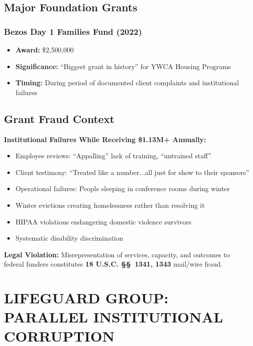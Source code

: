 \documentclass[11pt,letterpaper]{article}
\newcommand{\statref}[1]{\textbf{\color{NavyBlue}#1}}
\begin{document}
\subsection{Major Foundation Grants}

\subsubsection{Bezos Day 1 Families Fund (2022)}
\begin{itemize}[leftmargin=*]
\item \textbf{Award:} \$2,500,000
\item \textbf{Significance:} ``Biggest grant in history'' for YWCA Housing Programs
\item \textbf{Timing:} During period of documented client complaints and institutional failures
\end{itemize}

\subsection{Grant Fraud Context}

\textbf{Institutional Failures While Receiving \$1.13M+ Annually:}
\begin{itemize}[leftmargin=*]
\item Employee reviews: ``Appalling'' lack of training, ``untrained staff''
\item Client testimony: ``Treated like a number...all just for show to their sponsors''
\item Operational failures: People sleeping in conference rooms during winter
\item Winter evictions creating homelessness rather than resolving it
\item HIPAA violations endangering domestic violence survivors
\item Systematic disability discrimination
\end{itemize}

\textbf{Legal Violation:} Misrepresentation of services, capacity, and outcomes to federal funders constitutes \statref{18 U.S.C. \S\S~1341, 1343} mail/wire fraud.

\newpage

\section{LIFEGUARD GROUP: PARALLEL INSTITUTIONAL CORRUPTION}
\end{document}
